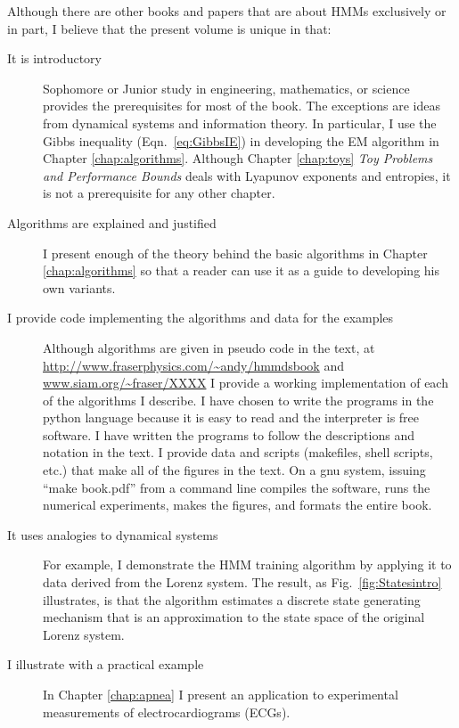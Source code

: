 \documentclass[]{hmmdsbook}
\begin{document}
Although there are other books and papers that are about HMMs
exclusively or in part, I believe that the present volume is unique in
that:
\begin{description}
\item[It is introductory] Sophomore or Junior study in engineering,
  mathematics, or science provides the prerequisites for most of the
  book.  The exceptions are ideas from dynamical systems and
  information theory.  In particular, I use the Gibbs inequality
  (Eqn.~\eqref{eq:GibbsIE}) in developing the EM algorithm in Chapter
  \ref{chap:algorithms}.  Although Chapter \ref{chap:toys} \emph{Toy
    Problems and Performance Bounds} deals with Lyapunov exponents and
  entropies, it is not a prerequisite for any other chapter.
\item[Algorithms are explained and justified] I present enough of the
  theory behind the basic algorithms in Chapter \ref{chap:algorithms}
  so that a reader can use it as a guide to developing his own
  variants.
\item[I provide code implementing the algorithms and data for the
  examples] Although algorithms are given in pseudo code in the text,
  at \url{http://www.fraserphysics.com/~andy/hmmdsbook} and
  \url{www.siam.org/~fraser/XXXX} I provide a working implementation
  of each of the algorithms I describe.  I have chosen to write the
  programs in the python language because it is easy to read and the
  interpreter is free software.  I have written the programs to follow
  the descriptions and notation in the text.  I provide data and
  scripts (makefiles, shell scripts, etc.)  that make all of the
  figures in the text.  On a gnu system, issuing ``make book.pdf''
  from a command line compiles the software, runs the numerical
  experiments, makes the figures, and formats the entire book.
\item[It uses analogies to dynamical systems] For example, I
  demonstrate the HMM training algorithm by applying it to data
  derived from the Lorenz system.  The result, as
  Fig.~\ref{fig:Statesintro} illustrates, is that the algorithm
  estimates a discrete state generating mechanism that is an
  approximation to the state space of the original Lorenz system.
\item[I illustrate with a practical example] In Chapter \ref{chap:apnea} I
  present an application to experimental measurements of
  electrocardiograms (ECGs).
\end{description}

\end{document}
